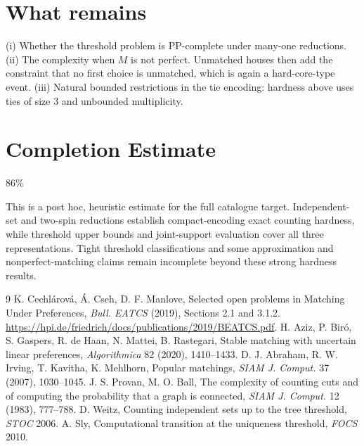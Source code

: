 \documentclass[11pt]{article}
\theoremstyle{definition}
\begin{document}
\section*{What remains}
(i) Whether the threshold problem is PP-complete under many-one reductions. (ii) The complexity when $M$ is not perfect.
Unmatched houses then add the constraint that no first choice is unmatched, which is again a hard-core-type event.
(iii) Natural bounded restrictions in the tie encoding: hardness above uses ties of size $3$ and unbounded multiplicity.

\section{Completion Estimate}
86\%

This is a post hoc, heuristic estimate for the full catalogue target.
Independent-set and two-spin reductions establish compact-encoding exact counting hardness, while threshold upper bounds and joint-support evaluation cover all three representations. Tight threshold classifications and some approximation and nonperfect-matching claims remain incomplete beyond these strong hardness results.

\begin{thebibliography}{9}
 K. Cechl\'arov\'a, \'A. Cseh, D. F. Manlove, Selected open problems in Matching Under Preferences,
\emph{Bull. EATCS} (2019), Sections 2.1 and 3.1.2. \url{https://hpi.de/friedrich/docs/publications/2019/BEATCS.pdf}.
 H. Aziz, P. Bir\'o, S. Gaspers, R. de Haan, N. Mattei, B. Rastegari, Stable matching with uncertain
linear preferences, \emph{Algorithmica} 82 (2020), 1410--1433.
 D. J. Abraham, R. W. Irving, T. Kavitha, K. Mehlhorn, Popular matchings, \emph{SIAM J. Comput.} 37 (2007), 1030--1045.
 J. S. Provan, M. O. Ball, The complexity of counting cuts and of computing the probability that a graph is
connected, \emph{SIAM J. Comput.} 12 (1983), 777--788.
 D. Weitz, Counting independent sets up to the tree threshold, \emph{STOC} 2006.
 A. Sly, Computational transition at the uniqueness threshold, \emph{FOCS} 2010.
\end{thebibliography}
\end{document}
